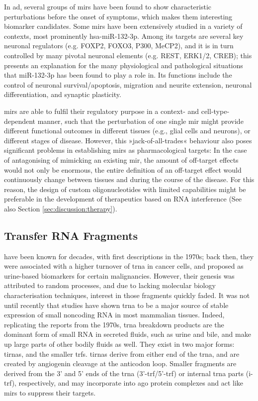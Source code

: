 In \ac{ad}, several groups of \acp{mir} have been found to show characteristic perturbations before the onset of symptoms, which makes them interesting biomarker candidates.\cite{Salta2017a} Some \acp{mir} have been extensively studied in a variety of contexts, most prominently hsa-miR-132-3p. Among its targets are several key neuronal regulators (e.g. FOXP2, FOXO3, P300, MeCP2), and it is in turn controlled by many pivotal neuronal elements (e.g. REST, ERK1/2, CREB); this presents an explanation for the many physiological and pathological situations that miR-132-3p has been found to play a role in. Its functions include the control of neuronal survival/apoptosis, migration and neurite extension, neuronal differentiation, and synaptic plasticity. 

\acp{mir} are able to fulfil their regulatory purpose in a context- and cell-type-dependent manner,\cite{Lu2015} such that the perturbation of one single \ac{mir} might provide different functional outcomes in different tissues (e.g., glial cells and neurons), or different stages of disease. However, this »jack-of-all-trades« behaviour also poses significant problems in establishing \acp{mir} as pharmacological targets: In the case of antagonising of mimicking an existing \ac{mir}, the amount of off-target effects would not only be enormous, the entire definition of an off-target effect would continuously change between tissues and during the course of the disease. For this reason, the design of custom oligonucleotides with limited capabilities might be preferable in the development of therapeutics based on RNA interference (See also Section \ref{sec:discussion:therapy}).

\subsection{Transfer RNA Fragments}
 have been known for decades, with first descriptions in the 1970s; back then, they were associated with a higher turnover of \ac{trna} in cancer cells,\cite{Borek1977} and proposed as urine-based biomarkers for certain malignancies.\cite{Speer1979} However, their genesis was attributed to random processes, and due to lacking molecular biology characterisation techniques, interest in those fragments quickly faded. It was not until recently that studies have shown \ac{trna} to be a major source of stable expression of small noncoding RNA\cite{Cole2009,Lee2009} in most mammalian tissues. Indeed, replicating the reports from the 1970s, \ac{trna} breakdown products are the dominant form of small RNA in secreted fluids, such as urine and bile, and make up large parts of other bodily fluids as well.\cite{Godoy2018} They exist in two major forms: \acp{tirna}, and the smaller \acfp{trf}. \acp{tirna} derive from either end of the \ac{trna}, and are created by angiogenin cleavage at the anticodon loop.\cite{Yamasaki2009,Ivanov2011} Smaller fragments are derived from the 3’ and 5’ ends of the \ac{trna} (3'-\ac{trf}/5'-\ac{trf}) or internal \ac{trna} parts (i-\ac{trf}), respectively, and may incorporate into \ac{ago} protein complexes and act like \acp{mir} to suppress their targets.\cite{Burroughs2011,Kumar2014}

